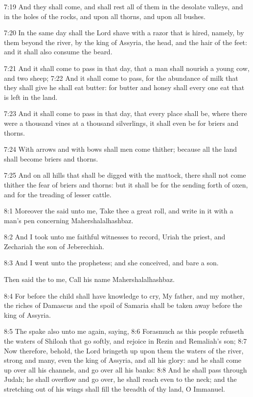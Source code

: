 7:19 And they shall come, and shall rest all of them in the desolate
valleys, and in the holes of the rocks, and upon all thorns, and upon
all bushes.

7:20 In the same day shall the Lord shave with a razor that is hired,
namely, by them beyond the river, by the king of Assyria, the head,
and the hair of the feet: and it shall also consume the beard.

7:21 And it shall come to pass in that day, that a man shall nourish a
young cow, and two sheep; 7:22 And it shall come to pass, for the
abundance of milk that they shall give he shall eat butter: for butter
and honey shall every one eat that is left in the land.

7:23 And it shall come to pass in that day, that every place shall be,
where there were a thousand vines at a thousand silverlings, it shall
even be for briers and thorns.

7:24 With arrows and with bows shall men come thither; because all the
land shall become briers and thorns.

7:25 And on all hills that shall be digged with the mattock, there
shall not come thither the fear of briers and thorns: but it shall be
for the sending forth of oxen, and for the treading of lesser cattle.

8:1 Moreover the \LORD said unto me, Take thee a great roll, and write
in it with a man's pen concerning Mahershalalhashbaz.

8:2 And I took unto me faithful witnesses to record, Uriah the priest,
and Zechariah the son of Jeberechiah.

8:3 And I went unto the prophetess; and she conceived, and bare a son.

Then said the \LORD to me, Call his name Mahershalalhashbaz.

8:4 For before the child shall have knowledge to cry, My father, and
my mother, the riches of Damascus and the spoil of Samaria shall be
taken away before the king of Assyria.

8:5 The \LORD spake also unto me again, saying, 8:6 Forasmuch as this
people refuseth the waters of Shiloah that go softly, and rejoice in
Rezin and Remaliah's son; 8:7 Now therefore, behold, the Lord bringeth
up upon them the waters of the river, strong and many, even the king
of Assyria, and all his glory: and he shall come up over all his
channels, and go over all his banks: 8:8 And he shall pass through
Judah; he shall overflow and go over, he shall reach even to the neck;
and the stretching out of his wings shall fill the breadth of thy
land, O Immanuel.

